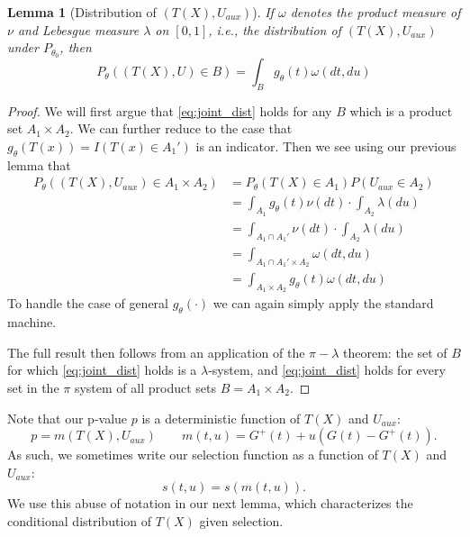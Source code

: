 \documentclass{article}
\newtheorem{lemma}{Lemma}
\begin{document}
\begin{appendix}
\begin{lemma}[Distribution of $(T(X), U_{aux})$]
    \label{lem:pi_lambda}
    If $\omega$ denotes the product measure of $\nu$ and Lebesgue measure $\lambda$ on $[0, 1]$, i.e., the distribution of $(T(X), U_{aux})$ under $P_{\theta_0}$, then 
    \begin{equation}
    \label{eq:joint_dist}
        P_{\theta}((T(X), U) \in B) = \int_{B} g_{\theta}(t) \omega(dt, du)
    \end{equation}
\end{lemma}

\begin{proof}
    We will first argue that \eqref{eq:joint_dist} holds for any $B$ which is a product set $A_1 \times A_2$. We can further reduce to the case that $g_{\theta}(T(x)) = I(T(x) \in A_1')$ is an indicator. Then we see using our previous lemma that 
    \begin{align*}
        P_{\theta}((T(X), U_{aux}) \in A_1 \times A_2) &= P_{\theta}(T(X) \in A_1)P(U_{aux} \in A_2)\\
                                          &= \int_{A_1} g_{\theta}(t) \nu(dt) \cdot \int_{A_2} \lambda(du)\\
                                          &= \int_{A_1 \cap A_1'} \nu(dt) \cdot \int_{A_2} \lambda(du)\\
                                          &= \int_{A_1 \cap A_1' \times A_2} \omega(dt, du)\\
                                          &= \int_{A_1 \times A_2} g_{\theta}(t)\omega(dt, du)
    \end{align*}
    To handle the case of general $g_{\theta}(\cdot)$ we can again simply apply the standard machine. 
    
    The full result then follows from an application of the $\pi-\lambda$ theorem: the set of $B$ for which \eqref{eq:joint_dist} holds is a $\lambda$-system, and \eqref{eq:joint_dist} holds for every set in the $\pi$ system of all product sets $B = A_1 \times A_2$. 
\end{proof}

Note that our p-value $p$ is a deterministic function of $T(X)$ and $U_{aux}$:
\begin{equation*}
    p = m(T(X), U_{aux}) \qquad m(t, u) = G^+(t) + u(G(t) - G^+(t)).
\end{equation*}
As such, we sometimes write our selection function as a function of $T(X)$ and $U_{aux}$:
\begin{equation*}
    s(t, u) = s(m(t, u)). 
\end{equation*}
We use this abuse of notation in our next lemma, which characterizes the conditional distribution of $T(X)$ given selection.


\end{appendix}
\end{document}
